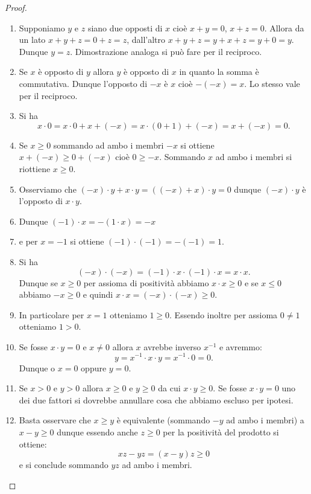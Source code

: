 \begin{proof}
\begin{enumerate}
\item
Supponiamo $y$ e $z$ siano due opposti di $x$ cioè $x+y=0$, $x+z=0$.
Allora da un lato $x+y+z = 0+z = z$, dall'altro $x+y+z = y+x+z= y+ 0 = y$.
Dunque $y=z$. Dimostrazione analoga si può fare per il reciproco.

\item
Se $x$ è opposto di $y$ allora $y$ è opposto di $x$ in quanto la somma
è commutativa. Dunque l'opposto di $-x$ è $x$ cioè $-(-x)=x$. Lo stesso
vale per il reciproco.

\item
Si ha
\[
x\cdot 0 = x \cdot 0 + x + (-x) %
=x\cdot(0+1) + (-x) = x + (-x) = 0.
\]

\item
Se $x\ge 0$ sommando ad ambo i membri $-x$ si ottiene $x+(-x) \ge 0 + (-x)$
cioè $0 \ge -x$. Sommando $x$ ad ambo i membri si riottiene $x\ge 0$.


\item
Osserviamo che $(-x)\cdot y + x\cdot y = ((-x)+x)\cdot y = 0$ dunque $(-x)\cdot y$ è l'opposto di $x\cdot y$.

\item
Dunque $(-1)\cdot x = - (1 \cdot x) = - x$

\item
e per $x=-1$ si ottiene $(-1)\cdot(-1) = -(-1) = 1$.

\item
Si ha
\[
(-x)\cdot(-x) = (-1)\cdot x \cdot (-1)\cdot x = x\cdot x.
\]
Dunque se $x\ge 0$ per assioma di positività
abbiamo $x\cdot x\ge 0$ e se $x\le 0$ abbiamo $-x\ge 0$ e quindi
$x\cdot x = (-x)\cdot(-x) \ge 0$.

\item
In particolare per $x=1$ otteniamo $1\ge 0$.
Essendo inoltre per assioma $0\neq 1$ otteniamo $1> 0$.

\item
Se fosse $x\cdot y = 0$ e $x\neq 0$ allora $x$ avrebbe inverso $x^{-1}$
e avremmo:
\[
  y = x^{-1} \cdot x \cdot y = x^{-1}\cdot 0 = 0.
\]
Dunque o $x=0$ oppure $y=0$.

\item
Se $x>0$ e $y>0$ allora $x\ge 0$ e $y\ge 0$ da cui $x\cdot y\ge 0$.
Se fosse $x\cdot y=0$ uno dei due fattori si dovrebbe annullare
cosa che abbiamo escluso per ipotesi.

\item
Basta osservare che $x\ge y$ è equivalente
(sommando $-y$ ad ambo i membri) a $x-y\ge 0$
dunque essendo anche $z\ge 0$ per la positività
del prodotto si ottiene:
\[
xz - yz = (x-y)z \ge 0
\]
e si conclude sommando $yz$ ad ambo i membri.
\end{enumerate}
\end{proof}



